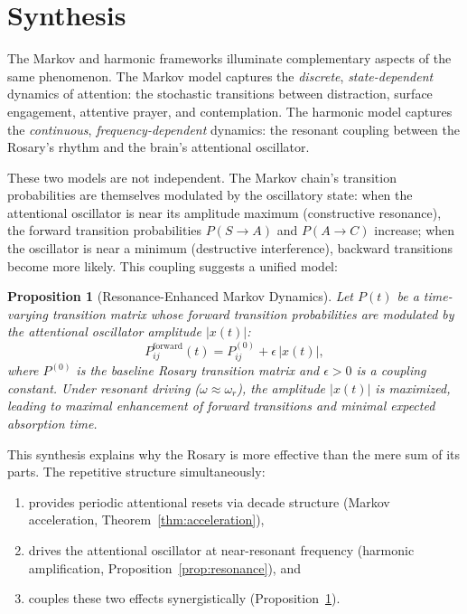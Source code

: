 \documentclass[journal]{IEEEtran}
\newtheorem{proposition}[theorem]{Proposition}
\theoremstyle{definition}
\theoremstyle{remark}
\begin{document}
\section{Synthesis}\label{sec:synthesis}

The Markov and harmonic frameworks illuminate complementary aspects of the same phenomenon. The Markov model captures the \emph{discrete}, \emph{state-dependent} dynamics of attention: the stochastic transitions between distraction, surface engagement, attentive prayer, and contemplation. The harmonic model captures the \emph{continuous}, \emph{frequency-dependent} dynamics: the resonant coupling between the Rosary's rhythm and the brain's attentional oscillator.

These two models are not independent. The Markov chain's transition probabilities are themselves modulated by the oscillatory state: when the attentional oscillator is near its amplitude maximum (constructive resonance), the forward transition probabilities $P(S \to A)$ and $P(A \to C)$ increase; when the oscillator is near a minimum (destructive interference), backward transitions become more likely. This coupling suggests a unified model:

\begin{proposition}[Resonance-Enhanced Markov Dynamics]\label{prop:coupled}
Let $P(t)$ be a time-varying transition matrix whose forward transition probabilities are modulated by the attentional oscillator amplitude $|x(t)|$:
\begin{equation}
P_{ij}^{\text{forward}}(t) = P_{ij}^{(0)} + \epsilon\, |x(t)|,
\end{equation}
where $P^{(0)}$ is the baseline Rosary transition matrix and $\epsilon > 0$ is a coupling constant. Under resonant driving ($\omega \approx \omega_r$), the amplitude $|x(t)|$ is maximized, leading to maximal enhancement of forward transitions and minimal expected absorption time.
\end{proposition}

This synthesis explains why the Rosary is more effective than the mere sum of its parts. The repetitive structure simultaneously:
\begin{enumerate}
\item provides periodic attentional resets via decade structure (Markov acceleration, Theorem~\ref{thm:acceleration}),
\item drives the attentional oscillator at near-resonant frequency (harmonic amplification, Proposition~\ref{prop:resonance}), and
\item couples these two effects synergistically (Proposition~\ref{prop:coupled}).
\end{enumerate}
\end{document}
